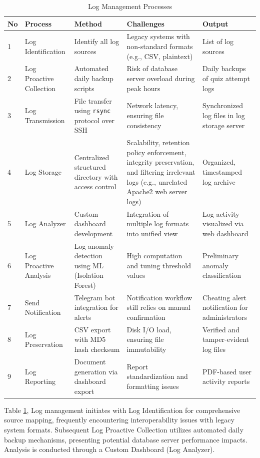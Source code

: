 \begin{table}[H]
	\centering
	\caption{Log Management Processes}
	\label{tab:log-management-challanges-output-method}
	\begin{tabularx}{\textwidth}{p{0.8cm} p{2.8cm} p{3.2cm} X X}
		\toprule
		\textbf{No} & \textbf{Process} & \textbf{Method} & \textbf{Challenges} & \textbf{Output} \\
		\midrule
		1 & Log Identification & Identify all log sources & Legacy systems with non-standard formats (e.g., CSV, plaintext) & List of log sources \\
		2 & Log Proactive Collection & Automated daily backup scripts & Risk of database server overload during peak hours & Daily backups of quiz attempt logs \\
		3 & Log Transmission & File transfer using \texttt{rsync} protocol over SSH & Network latency, ensuring file consistency & Synchronized log files in log storage server \\
		4 & Log Storage & Centralized structured directory with access control & Scalability, retention policy enforcement, integrity preservation, and filtering irrelevant logs (e.g., unrelated Apache2 web server logs) & Organized, timestamped log archive \\
		5 & Log Analyzer & Custom dashboard development & Integration of multiple log formats into unified view & Log activity visualized via web dashboard \\
		6 & Log Proactive Analysis & Log anomaly detection using ML (Isolation Forest) & High computation and tuning threshold values & Preliminary anomaly classification \\
		7 & Send Notification & Telegram bot integration for alerts & Notification workflow still relies on manual confirmation & Cheating alert notification for administrators \\
		8 & Log Preservation & CSV export with MD5 hash checksum & Disk I/O load, ensuring file immutability & Verified and tamper-evident log files \\
		9 & Log Reporting & Document generation via dashboard export & Report standardization and formatting issues & PDF-based user activity reports \\
		\bottomrule
	\end{tabularx}
\end{table}


Table \ref{tab:log-management-challanges-output-method}, Log management initiates with Log Identification for comprehensive source mapping, frequently encountering interoperability issues with legacy system formats. Subsequent Log Proactive Collection utilizes automated daily backup mechanisms, presenting potential database server performance impacts. Analysis is conducted through a Custom Dashboard (Log Analyzer).



